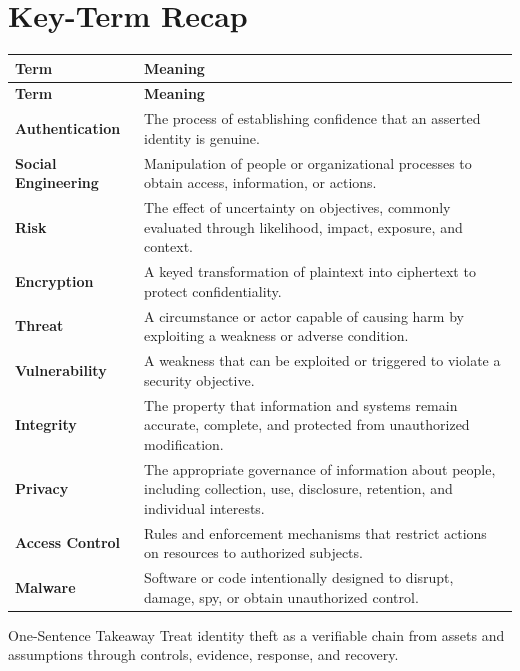 \documentclass[11pt,letterpaper]{article}
\begin{document}
\section*{Key-Term Recap}
\begin{longtable}{>{\raggedright\arraybackslash}p{}>{\raggedright\arraybackslash}p{}}
\toprule\rowcolor{Navy}\color{white}\textbf{Term} & \color{white}\textbf{Meaning}\\\midrule
\endfirsthead
\toprule\rowcolor{Navy}\color{white}\textbf{Term} & \color{white}\textbf{Meaning}\\\midrule
\endhead
\textbf{Authentication} & The process of establishing confidence that an asserted identity is genuine. \\\midrule
\textbf{Social Engineering} & Manipulation of people or organizational processes to obtain access, information, or actions. \\\midrule
\textbf{Risk} & The effect of uncertainty on objectives, commonly evaluated through likelihood, impact, exposure, and context. \\\midrule
\textbf{Encryption} & A keyed transformation of plaintext into ciphertext to protect confidentiality. \\\midrule
\textbf{Threat} & A circumstance or actor capable of causing harm by exploiting a weakness or adverse condition. \\\midrule
\textbf{Vulnerability} & A weakness that can be exploited or triggered to violate a security objective. \\\midrule
\textbf{Integrity} & The property that information and systems remain accurate, complete, and protected from unauthorized modification. \\\midrule
\textbf{Privacy} & The appropriate governance of information about people, including collection, use, disclosure, retention, and individual interests. \\\midrule
\textbf{Access Control} & Rules and enforcement mechanisms that restrict actions on resources to authorized subjects. \\\midrule
\textbf{Malware} & Software or code intentionally designed to disrupt, damage, spy, or obtain unauthorized control. \\\midrule
\bottomrule
\end{longtable}
\begin{CornellExamBox}{One-Sentence Takeaway}
Treat identity theft as a verifiable chain from assets and assumptions through controls, evidence, response, and recovery.
\end{CornellExamBox}
\end{document}
